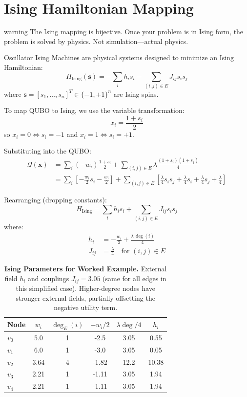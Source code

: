 \section{Ising Hamiltonian Mapping}
\begin{block}{warning}
The Ising mapping is bijective. Once your problem is in Ising form, the problem is solved by physics. Not simulation—actual physics.
\end{block}

\label{sec:ising-mapping}

Oscillator Ising Machines are physical systems designed to minimize an Ising Hamiltonian:
\[
H_{\text{Ising}}(\mathbf{s}) = -\sum_i h_i s_i - \sum_{(i,j) \in E} J_{ij} s_i s_j
\]
where $\mathbf{s} = [s_1, \ldots, s_n]^T \in \{-1, +1\}^n$ are Ising spins.

To map QUBO to Ising, we use the variable transformation:
\[
x_i = \frac{1 + s_i}{2}
\]
so $x_i = 0 \Leftrightarrow s_i = -1$ and $x_i = 1 \Leftrightarrow s_i = +1$.

Substituting into the QUBO:
\begin{align}
\mathcal{Q}(\mathbf{x}) &= \sum_i (-w_i) \frac{1+s_i}{2} + \sum_{(i,j)\in E} \lambda \frac{(1+s_i)(1+s_j)}{4} \\
&= \sum_i \left[-\frac{w_i}{2} s_i - \frac{w_i}{2}\right] + \sum_{(i,j)\in E} \left[\frac{\lambda}{4} s_i s_j + \frac{\lambda}{4} s_i + \frac{\lambda}{4} s_j + \frac{\lambda}{4}\right]
\end{align}

Rearranging (dropping constants):
\[
H_{\text{Ising}} = \sum_i h_i s_i + \sum_{(i,j)\in E} J_{ij} s_i s_j
\]
where:
\begin{align}
h_i &= -\frac{w_i}{2} + \frac{\lambda \, \deg(i)}{4} \\
J_{ij} &= \frac{\lambda}{4} \quad \text{for } (i,j) \in E
\end{align}

\begin{table}[H]
\centering
\small
\begin{tabular}{lccccc}
\toprule
\textbf{Node} & $w_i$ & $\deg_E(i)$ & $-w_i/2$ & $\lambda \deg/4$ & $h_i$ \\
\midrule
$v_0$ & 5.0 & 1 & -2.5 & 3.05 & 0.55 \\
$v_1$ & 6.0 & 1 & -3.0 & 3.05 & 0.05 \\
$v_2$ & 3.64 & 4 & -1.82 & 12.2 & 10.38 \\
$v_3$ & 2.21 & 1 & -1.11 & 3.05 & 1.94 \\
$v_4$ & 2.21 & 1 & -1.11 & 3.05 & 1.94 \\
\bottomrule
\end{tabular}
\caption{\textbf{Ising Parameters for Worked Example.} External field $h_i$ and couplings $J_{ij} = 3.05$ (same for all edges in this simplified case). Higher-degree nodes have stronger external fields, partially offsetting the negative utility term.}
\label{tab:ising-params}
\end{table}

